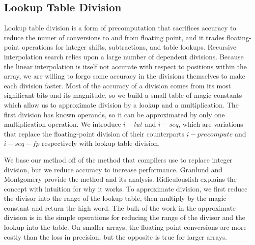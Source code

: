 \documentclass[twocolumn]{article}
\begin{document}
\subsection{Lookup Table Division}
\label{lut}
Lookup table division is a form of precomputation that sacrifices accuracy to reduce the numer of conversions to and from floating point, and it trades floating-point operations for integer shifts, subtractions, and table lookups. Recursive interpolation search relies upon a large number of dependent divisions. Because the linear interpolation is itself not accurate with respect to positions within the array, we are willing to forgo some accuracy in the divisions themselves to make each division faster.  Most of the accuracy of a division comes from its most significant bits and its magnitude, so we build a small table of magic constants which allow us to approximate division by a lookup and a multiplication. The first division has known operands, so it can be approximated by only one multiplication operation. We introduce $i-lut$ and $i-seq$, which are variations that replace the floating-point division of their counterparts $i-precompute$ and $i-seq-fp$ respectively with lookup table division.

We base our method off of the method that compilers use to replace integer division, but we reduce accuracy to increase performance. Granlund and Montgomery \cite{granlund-montgomery} provide the method and its analysis. Ridiculousfish \cite{fish} explains the concept with intuition for why it works. To approximate division, we first reduce the divisor into the range of the lookup table, then multiply by the magic constant and return the high word. The bulk of the work in the approximate division is in the simple operations for reducing the range of the divisor and the lookup into the table. On smaller arrays, the floating point conversions are more costly than the loss in precision, but the opposite is true for larger arrays.
\end{document}
